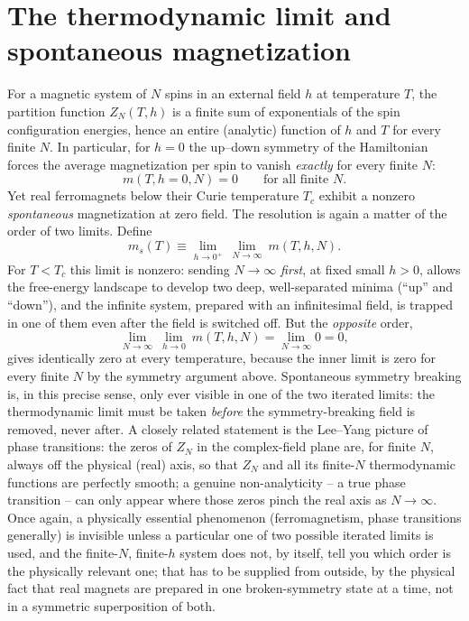 \section{The thermodynamic limit and spontaneous magnetization}
\label{limits:td}
For a magnetic system of $N$ spins in an external field $h$ at
temperature $T$, the partition function $Z_N(T,h)$ is a finite
sum of exponentials of the spin configuration energies, hence an
entire (analytic) function of $h$ and $T$ for every finite $N$.
In particular, for $h=0$ the up--down symmetry of the
Hamiltonian forces the average magnetization per spin to vanish
\emph{exactly} for every finite $N$:
\begin{equation}
m(T,h=0,N) = 0 \qquad \text{for all finite } N.
\end{equation}
Yet real ferromagnets below their Curie temperature $T_c$
exhibit a nonzero \emph{spontaneous} magnetization at zero
field. The resolution is again a matter of the order of two
limits. Define
\begin{equation}
m_s(T) \equiv \lim_{h\to0^+}\ \lim_{N\to\infty}\ m(T,h,N).
\end{equation}
For $T<T_c$ this limit is nonzero: sending $N\to\infty$
\emph{first}, at fixed small $h>0$, allows the free-energy
landscape to develop two deep, well-separated minima (``up'' and
``down''), and the infinite system, prepared with an
infinitesimal field, is trapped in one of them even after the
field is switched off. But the \emph{opposite} order,
\begin{equation}
\lim_{N\to\infty}\ \lim_{h\to0}\ m(T,h,N) = \lim_{N\to\infty} 0 = 0,
\end{equation}
gives identically zero at every temperature, because the inner
limit is zero for every finite $N$ by the symmetry argument
above. Spontaneous symmetry breaking is, in this precise sense,
only ever visible in one of the two iterated limits: the
thermodynamic limit must be taken \emph{before} the
symmetry-breaking field is removed, never after. A closely
related statement is the Lee--Yang picture of phase transitions:
the zeros of $Z_N$ in the complex-field plane are, for finite
$N$, always off the physical (real) axis, so that $Z_N$ and all
its finite-$N$ thermodynamic functions are perfectly smooth; a
genuine non-analyticity -- a true phase transition -- can only
appear where those zeros pinch the real axis as $N\to\infty$.
Once again, a physically essential phenomenon (ferromagnetism,
phase transitions generally) is invisible unless a particular
one of two possible iterated limits is used, and the finite-$N$,
finite-$h$ system does not, by itself, tell you which order is
the physically relevant one; that has to be supplied from
outside, by the physical fact that real magnets are prepared in
one broken-symmetry state at a time, not in a symmetric
superposition of both.

